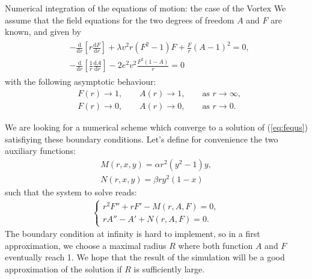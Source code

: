 \begin{section}{Numerical integration of the equations of motion: the case of the Vortex}\label{ann:num}
  We assume that the field equations for the two degrees of freedom
  $A$ and $F$ are known, and given by
  \begin{align}
    \begin{aligned}
      &-\frac{\mathrm d}{\mathrm d r}\left[r\frac{\mathrm d F}{\mathrm dr}\right]+\lambda v^2 r (F^2-1)F+ \frac{F}{r}(A-1)^2 = 0,\\
      &-\frac{\mathrm d}{\mathrm d r}\left[\frac{1}{r}\frac{\mathrm d A}{\mathrm d r}\right] - 2e^2v^2\frac{F^2(1-A)}{r} = 0
    \end{aligned}\label{eq:fequs}
  \end{align}
  with the following asymptotic behaviour:
  \begin{align}
    &F(r) \to 1,\qquad A(r) \to 1,\qquad \text{as }r\to \infty,\\
    &F(r) \to 0,\qquad A(r) \to 0,\qquad \text{as }r\to 0.
  \end{align}
  
  We are looking for a numerical scheme which converge to a solution
  of (\ref{eq:fequs}) satisfiying these boundary conditions. Let's
  define for convenience the two auxiliary functions:
  \begin{align}
    M(r,x,y) = \alpha r^2(y^2-1)y,\\
    N(r,x,y) = \beta ry^2(1-x)
  \end{align}
  such that the system to solve reads:
  \begin{align}
    \left\{\begin{aligned}
      r^2F''+rF'-M(r,A,F) = 0,\\
      rA''-A'+N(r,A,F) = 0.
    \end{aligned}\right.\label{eq:nonlinsyst}
  \end{align}
  The boundary condition at infinity is hard to implement, so in a
  first approximation, we choose a maximal radius $R$ where both
  function $A$ and $F$ eventually reach 1. We hope that the result of
  the simulation will be a good approximation of the solution if $R$
  is sufficiently large.
  

\end{section}
